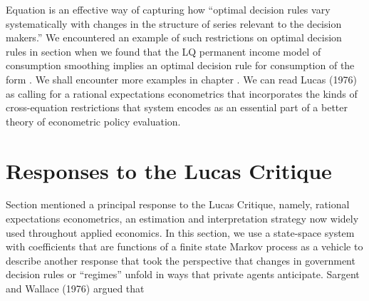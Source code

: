  Equation  is an effective way of capturing  how ``optimal decision rules vary systematically with changes in the structure of
 series relevant to the decision makers.''  We   encountered an example of  such restrictions  on optimal decision rules in
 section  when we found that the LQ permanent income model of consumption smoothing implies an optimal decision rule
   for consumption of the form . We shall encounter  more examples  in chapter .
  We can read   Lucas (1976) as  calling for  a rational expectations econometrics that incorporates  the kinds of cross-equation
restrictions  that system  encodes as an essential part of a better theory of econometric policy 
evaluation.
%
%
%


\section{Responses to the Lucas Critique}\label{sec:lucascritique2}%
Section  mentioned a principal response to the Lucas Critique,  namely,
rational expectations econometrics, an estimation and interpretation strategy now widely used throughout  applied economics.
In this section, we use a  state-space system with coefficients that are functions of a finite state Markov process 
as a vehicle to describe
another response
that took  the perspective that 
changes in  government  decision rules  or ``regimes''   
unfold in ways that private agents  anticipate.  %
Sargent and Wallace (1976) argued that


